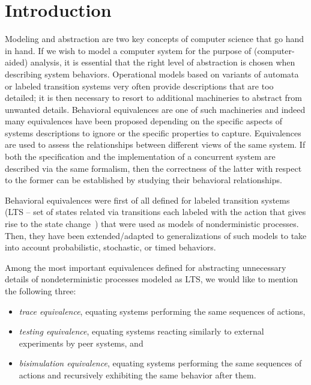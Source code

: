 \documentclass{LMCS}
\begin{document}

\maketitle



\section{Introduction}
\label{sec:intro}


Modeling and abstraction are two key concepts of computer science that go hand in hand. If we wish to model
a computer system for the purpose of (computer-aided) analysis, it is essential that the right level of
abstraction is chosen when describing system behaviors. Operational models based on variants of automata or
labeled transition systems very often provide descriptions that are too detailed; it is then necessary to
resort to additional machineries to abstract from unwanted details. Behavioral equivalences are one of such
machineries and indeed many equivalences have been proposed depending on the specific aspects of systems
descriptions to ignore or the specific properties to capture. Equivalences are used to assess the
relationships between different views of the same system. If both the specification and the implementation
of a concurrent system are described via the same formalism, then the correctness of the latter with respect
to the former can be established by studying their behavioral relationships.

Behavioral equivalences were first of all defined for labeled transition systems (LTS -- set of states
related via transitions each labeled with the action that gives rise to the state change~\cite{Kel76}) that
were used as models of nonderministic processes. Then, they have been extended/adapted to generalizations of
such models to take into account probabilistic, stochastic, or timed behaviors.

Among the most important equivalences defined for abstracting unnecessary details of nondeterministic
processes modeled as LTS, we would like to mention the following three:

	\begin{itemize}

\item \emph{trace equivalence}, equating systems performing the same sequences of actions, 

\item \emph{testing equivalence}, equating systems reacting similarly to external experiments by peer
systems, and

\item \emph{bisimulation equivalence}, equating systems performing the same sequences of actions and
recursively exhibiting the same behavior after them.

	\end{itemize}
\end{document}
